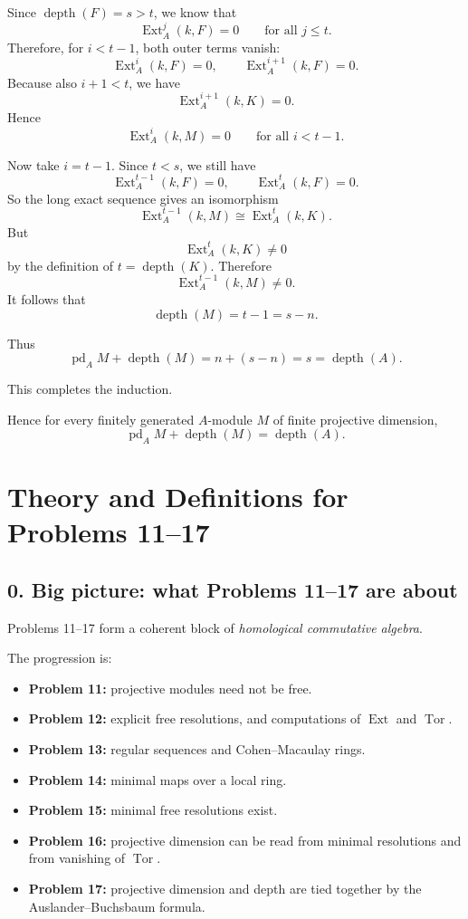 \documentclass[12pt,a4paper,oneside]{report}
\theoremstyle{notespace}
\begin{document}
Since \(\operatorname{depth}(F)=s>t\), we know that
\[
\operatorname{Ext}_A^j(k,F)=0
\qquad\text{for all }j\le t.
\]
Therefore, for \(i<t-1\), both outer terms vanish:
\[
\operatorname{Ext}_A^i(k,F)=0,
\qquad
\operatorname{Ext}_A^{i+1}(k,F)=0.
\]
Because also \(i+1<t\), we have
\[
\operatorname{Ext}_A^{i+1}(k,K)=0.
\]
Hence
\[
\operatorname{Ext}_A^i(k,M)=0
\qquad\text{for all }i<t-1.
\]

Now take \(i=t-1\). Since \(t<s\), we still have
\[
\operatorname{Ext}_A^{t-1}(k,F)=0,
\qquad
\operatorname{Ext}_A^{t}(k,F)=0.
\]
So the long exact sequence gives an isomorphism
\[
\operatorname{Ext}_A^{t-1}(k,M)\cong \operatorname{Ext}_A^t(k,K).
\]
But
\[
\operatorname{Ext}_A^t(k,K)\neq 0
\]
by the definition of \(t=\operatorname{depth}(K)\). Therefore
\[
\operatorname{Ext}_A^{t-1}(k,M)\neq 0.
\]
It follows that
\[
\operatorname{depth}(M)=t-1=s-n.
\]

Thus
\[
\operatorname{pd}_A M+\operatorname{depth}(M)
=
n+(s-n)=s=\operatorname{depth}(A).
\]

This completes the induction.

\medskip

Hence for every finitely generated \(A\)-module \(M\) of finite projective dimension,
\[
\boxed{
	\operatorname{pd}_A M+\operatorname{depth}(M)=\operatorname{depth}(A).
}
\]

\chapter{Theory and Definitions for Problems 11--17}

\section{0. Big picture: what Problems 11--17 are about}

Problems 11--17 form a coherent block of \emph{homological commutative algebra}.

The progression is:

\begin{itemize}
	\item \textbf{Problem 11:} projective modules need not be free.
	\item \textbf{Problem 12:} explicit free resolutions, and computations of \(\operatorname{Ext}\) and \(\operatorname{Tor}\).
	\item \textbf{Problem 13:} regular sequences and Cohen--Macaulay rings.
	\item \textbf{Problem 14:} minimal maps over a local ring.
	\item \textbf{Problem 15:} minimal free resolutions exist.
	\item \textbf{Problem 16:} projective dimension can be read from minimal resolutions and from vanishing of \(\operatorname{Tor}\).
	\item \textbf{Problem 17:} projective dimension and depth are tied together by the Auslander--Buchsbaum formula.
\end{itemize}
\end{document}
